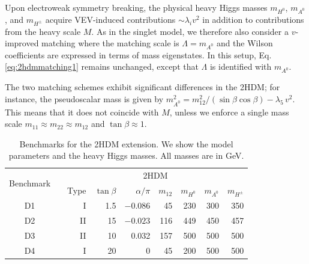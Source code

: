 Upon electroweak symmetry breaking, the physical heavy Higgs masses
$m_{H^0}$, $m_{A^0}$, and $m_{H^{\pm}}$ acquire VEV-induced
contributions $\sim \lambda_i v^2$ in addition to contributions from
the heavy scale $M$.  As in the singlet model, we therefore also
consider a $v$-improved matching where the matching scale is $\Lambda
= m_{A^0}$ and the Wilson coefficients are expressed in terms of mass
eigenstates.  In this setup, Eq.\,\eqref{eq:2hdmmatching1} remains
unchanged, except that $\Lambda$ is identified with $m_{A^0}$.

The two matching schemes exhibit significant differences in the 2HDM;
for instance, the pseudoscalar mass is given by $m^2_{A^0} =
m_{12}^2/(\sin\beta\cos\beta) -\lambda_5\,v^2$. This means that it
does not coincide with $M$, unless we enforce a single mass scale
$m_{11} \approx m_{22} \approx m_{12}$ and $\tan \beta \approx
1$.

\begin{table}[t] \renewcommand{\arraystretch}{1.2} \centering
  \begin{tabular}{c c rrrrrrr } \toprule \multirow{2}{*}{Benchmark}
&\hspace*{1em}& \multicolumn{7}{c}{2HDM} \\ \cmidrule{3-9} && Type &
$\tan\beta$ & $\alpha/\pi$ & $m_{12} $ & $m_{H^0} $ & $m_{A^0} $ &
$m_{H^\pm}$ \\ \midrule D1 && I & 1.5 & $-0.086$ & 45 & 230 & 300 &
350 \\ D2 && II & 15 & $-0.023$ & 116 & 449 & 450 & 457 \\ D3 && II &
10 & 0.032 & 157 & 500 & 500 & 500 \\ D4 && I & 20 & 0 & 45 & 200 &
500 & 500 \\ \bottomrule
  \end{tabular}
 \caption{Benchmarks for the 2HDM extension. We show the model
parameters and the heavy Higgs masses. All masses are in GeV.}
 \label{tab:2hdm_benchmarks}
\end{table}

